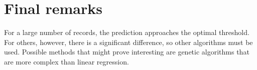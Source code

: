 \section{Final remarks}
For a large number of records, the prediction approaches the optimal threshold. For others, however, there is a significant difference, so other algorithms must be used. Possible methods that might prove interesting are genetic algorithms that are more complex than linear regression.

